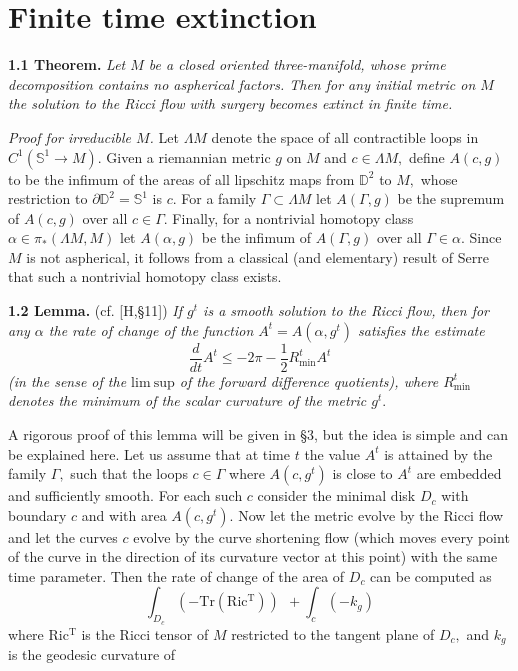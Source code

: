 \documentclass{article}
\begin{document}
\section{Finite time extinction}
\par {\bf 1.1 Theorem.} {\it Let $M$ be a closed oriented
three-manifold, whose prime decomposition contains no aspherical
factors. Then for any initial metric on $M$ the solution to the
Ricci flow with surgery becomes extinct in finite time.}
\par {\it Proof for irreducible $M$.} Let $\Lambda M$ denote the
space of all contractible loops in $C^1(\mathbb{S}^1\to M).$ Given
a riemannian metric $g$ on $M$ and $c\in\Lambda M,$ define
$A(c,g)$ to be the infimum of the areas of all lipschitz maps from
$\mathbb{D}^2$ to $M,$ whose restriction to
$\partial\mathbb{D}^2=\mathbb{S}^1$ is $c.$ For a family
$\Gamma\subset\Lambda M$ let $A(\Gamma ,g)$ be the supremum of
$A(c,g)$ over all $c\in\Gamma.$ Finally, for a nontrivial homotopy
class $\alpha\in\pi_{\ast}(\Lambda M,M)$ let $A(\alpha ,g)$ be the
infimum of $A(\Gamma ,g)$ over all $\Gamma\in\alpha.$ Since $M$ is
not aspherical, it follows from a classical (and elementary)
result of Serre that such a nontrivial homotopy class exists.
\par {\bf 1.2 Lemma.} (cf. [H,\S 11]) {\it If $g^t$ is a smooth
solution to the Ricci flow, then for any $\alpha$ the rate of
change of the function $A^t=A(\alpha ,g^t)$ satisfies the estimate
$$ \frac{d}{dt}A^t\le-2\pi-\frac{1}{2}R^t_{\mathrm{min}}A^t $$
(in the sense of the $\mathrm{lim \  sup}$ of the forward
difference quotients), where $R^t_{\mathrm{min}}$ denotes the
minimum of the scalar curvature of the metric $g^t.$ }
\par A rigorous proof of this lemma will be given in \S 3, but the
idea is simple and can be explained here. Let us assume that at
time $t$ the value $A^t$ is attained by the family $\Gamma,$ such
that the loops $c\in\Gamma$ where $A(c,g^t)$ is close to $A^t$ are
embedded and sufficiently smooth. For each such $c$ consider the
minimal disk $D_c$ with boundary $c$ and with area $A(c,g^t).$ Now
let the metric evolve by the Ricci flow and let the curves $c$
evolve by the curve shortening flow (which moves every point of
the curve in the direction of its curvature vector at this point)
with the same time parameter. Then the rate of change of the area
of $D_c$ can be computed as
$$\int_{D_c}{(-\mathrm{Tr(Ric^T)})}\ \ + \int_c{(-k_g)}$$
where $\mathrm{Ric^T}$ is the Ricci tensor of $M$ restricted to
the tangent plane of $D_c,$ and $k_g$ is the geodesic curvature of
\end{document}
